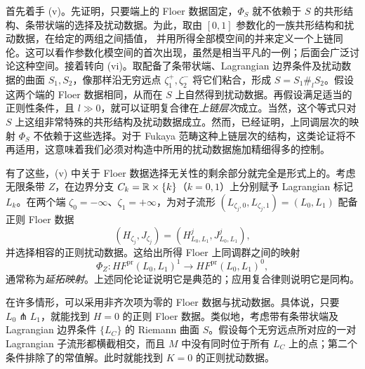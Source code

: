 首先着手 (v)。先证明，只要端上的 Floer 数据固定，$\Phi_S$ 就不依赖于 $S$ 的共形结构、条带状端的选择及扰动数据。为此，取由 $[0,1]$ 参数化的一族共形结构和扰动数据，在给定的两组之间插值，
并用所得全部模空间的并来定义一个上链同伦。这可以看作参数化模空间的首次出现，虽然是相当平凡的一例；后面会广泛讨论这种空间。接着转向 (vi)。取配备了条带状端、Lagrangian 边界条件及扰动数据的曲面 $S_1,S_2$，像那样沿无穷远点 $\zeta_1^+,\zeta_2^-$ 将它们粘合，形成 $S=S_1\#_lS_2$。假设这两个端的 Floer 数据相同，从而在 $S$ 上自然得到扰动数据。再假设满足适当的正则性条件，且 $l\gg0$，就可以证明复合律在\emph{上链层次}成立。当然，这个等式只对 $S$ 上这组非常特殊的共形结构及扰动数据成立。然而，已经证明，上同调层次的映射 $\Phi_S$ 不依赖于这些选择。对于 Fukaya 范畴这种上链层次的结构，这类论证将不再适用，这意味着我们必须对构造中所用的扰动数据施加精细得多的控制。

有了这些，(v) 中关于 Floer 数据选择无关性的剩余部分就完全是形式上的。考虑无限条带 $Z$，在边界分支 $C_k=\mathbb R\times\{k\}$（$k=0,1$）上分别赋予 Lagrangian 标记 $L_k$。在两个端 $\zeta_0=-\infty$、$\zeta_1=+\infty$，为对子流形 $(L_{\zeta_j,0},L_{\zeta_j,1})=(L_0,L_1)$ 配备正则 Floer 数据
\[
(H_{\zeta_j},J_{\zeta_j})=(H^j_{L_0,L_1},J^j_{L_0,L_1}),
\]
并选择相容的正则扰动数据。这给出所得 Floer 上同调群之间的映射
\[
\Phi_Z:HF^{\mathrm{pr}}(L_0,L_1)^1\longrightarrow HF^{\mathrm{pr}}(L_0,L_1)^0,
\]
通常称为\emph{延拓映射}。上述同伦论证说明它是典范的；应用复合律则说明它是同构。

\begin{note}\label{st:8.2}
在许多情形，可以采用非齐次项为零的 Floer 数据与扰动数据。具体说，只要 $L_0\pitchfork L_1$，就能找到 $H=0$ 的正则 Floer 数据。类似地，考虑带有条带状端及 Lagrangian 边界条件 $\{L_C\}$ 的 Riemann 曲面 $S$。假设每个无穷远点所对应的一对 Lagrangian 子流形都横截相交，而且 $M$ 中没有同时位于所有 $L_C$ 上的点；第二个条件排除了的常值解。此时就能找到 $K=0$ 的正则扰动数据。
\end{note}

